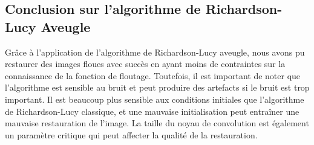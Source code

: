 \subsection{Conclusion sur l'algorithme de Richardson-Lucy Aveugle}

Grâce à l'application de l'algorithme de Richardson-Lucy aveugle, nous avons pu restaurer des images floues avec succès en ayant moins de contraintes sur la connaissance de la fonction de floutage.
Toutefois, il est important de noter que l'algorithme est sensible au bruit et peut produire des artefacts si le bruit est trop important.
Il est beaucoup plus sensible aux conditions initiales que l'algorithme de Richardson-Lucy classique, et une mauvaise initialisation peut entraîner une mauvaise restauration de l'image.
La taille du noyau de convolution est également un paramètre critique qui peut affecter la qualité de la restauration.